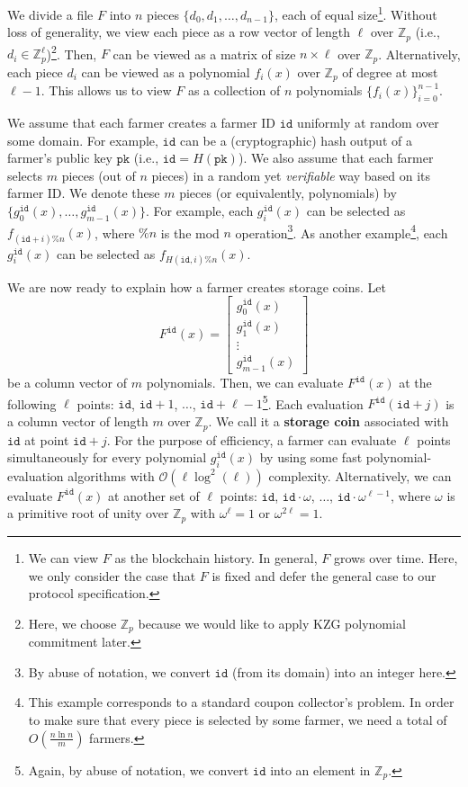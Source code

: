 \documentclass[conference]{IEEEtran}
\newcommand{\Fp}{\mathbb{Z}_p}
\newcommand{\pk}{\texttt{pk}}
\newcommand{\id}{\texttt{id}}
\begin{document}
We divide a file $F$ into $n$ pieces $\{ d_0, d_1, \ldots, d_{n-1}\}$, each of equal size\footnote{We can view $F$ as the blockchain history. In general, $F$ grows over time. Here, we only consider the case that $F$ is fixed and defer the general case to our protocol specification.}. 
Without loss of generality, we view each piece as a row vector of length $\ell$ over $\Fp$  (i.e., $d_i \in \Fp^\ell$)\footnote{Here, we choose $\Fp$ because we would like to apply KZG polynomial commitment later.}.
Then, $F$ can be viewed as a matrix of size $n \times \ell$ over $\Fp$.
Alternatively, each piece $d_i$ can be viewed as a polynomial $f_i(x)$ over $\Fp$ of degree at most $\ell - 1$. 
This allows us to view $F$ as a collection of $n$ polynomials $\{ f_i(x) \}_{i = 0}^{n-1}$. 

We assume that each farmer creates a farmer ID $\id$ uniformly at random over some domain. For example, $\id$ can be a (cryptographic) hash output of a farmer's public key $\pk$ (i.e., $\id = H(\pk)$).
We also assume that each farmer selects $m$ pieces (out of $n$ pieces) in a random yet \emph{verifiable} way based on its farmer ID.
We denote these $m$ pieces (or equivalently, polynomials) by $\{g_0^{\id}(x), \ldots, g_{m-1}^{\id}(x) \}$.
For example, each $g_i^{\id}(x)$ can be selected as $f_{(\id + i)\% n}(x)$, where $\% n$ is the mod $n$ operation\footnote{By abuse of notation, we convert $\id$ (from its domain) into an integer here.}.
As another example\footnote{This example corresponds to a standard coupon collector's problem. In order to make sure that every piece is selected by some farmer, we need a total of $O\left( \frac{n \ln n}{m} \right)$ farmers.}, each $g_i^{\id}(x)$ can be selected as $f_{H(\id, i)\% n}(x)$.

We are now ready to explain how a farmer creates storage coins. Let
\[
F^{\id}(x) = \begin{bmatrix} g_0^{\id}(x)\\ g_1^{\id}(x)\\  \vdots \\ g_{m-1}^{\id}(x) \end{bmatrix}
\]
be a column vector of $m$ polynomials. 
Then, we can evaluate $F^{\id}(x)$ at the following $\ell$ points: $\id$, $\id + 1$, $\ldots$, $\id + \ell - 1$\footnote{Again, by abuse of notation, we convert $\id$ into an element in $\Fp$.}.
Each evaluation $F^{\id}(\id + j)$ is a column vector of length $m$ over $\Fp$. We  call it a {\bf storage coin}
associated with $\id$ at point $\id + j$.
For the purpose of efficiency, a farmer can evaluate $\ell$ points simultaneously for every polynomial $g_i^{\id}(x)$
by using some fast polynomial-evaluation algorithms with $\mathcal{O}(\ell \log^2(\ell))$ complexity.
Alternatively, we can evaluate $F^{\id}(x)$ at another set of $\ell$ points: $\id$, $\id \cdot \omega$, $\ldots$, $\id \cdot \omega^{\ell - 1}$, where $\omega$ is a primitive root of unity over $\Fp$ with $\omega^\ell = 1$ or $\omega^{2 \ell} = 1$.
\end{document}
